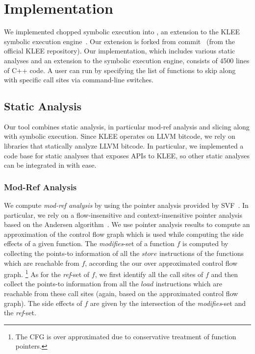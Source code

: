 
\chapter{Implementation}\label{chapter:implementation}

We implemented chopped symbolic execution into \toolname, an extension
to the KLEE symbolic execution
engine~\cite{klee}.
Our extension is forked from commit~ (from the official KLEE repository).
Our implementation, which includes various static analyses
and an extension to the symbolic execution engine,
consists of 4500 lines of C++ code.
A user can run \toolname by
specifying the list of functions to skip along with specific call
sites via command-line switches.

\section{Static Analysis}
Our tool combines static analysis, in particular mod-ref analysis and slicing
along with symbolic execution.
Since KLEE operates on LLVM bitcode, we rely on libraries
that statically analyze LLVM bitcode.
In particular, we implemented a code base for static analyses that exposes APIs to KLEE,
so other static analyses can be integrated in \toolname with ease.

\subsection{Mod-Ref Analysis}
We compute \textit{mod-ref analysis} by using the pointer analysis
provided by SVF~\cite{sui2016svf}. In particular, we rely on a
flow-insensitive and context-insensitive pointer analysis based on the
Andersen algorithm~\cite{andersen:pointeranalysis}.
We use pointer analysis results to
compute an approximation of the control flow graph
which is used while computing the side effects of a given function.
The \textit{modifies}-set of a function $f$ is computed
by collecting the points-to information of all the $store$ instructions of the functions which
are reachable from $f$, according the our over approximated control flow graph.
\footnote{The CFG is over approximated due to conservative treatment of function pointers.}
As for the \textit{ref}-set of $f$, we first identify all the call sites of $f$
and then collect the points-to information from all the $load$ instructions which are reachable
from these call sites (again, based on the approximated control flow graph).
The side effects of $f$ are given by the intersection of the \textit{modifies}-set and the \textit{ref}-set.

